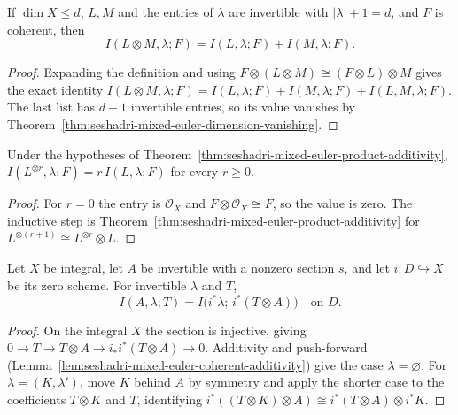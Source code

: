 \begin{theorem}
\label{thm:seshadri-mixed-euler-product-additivity}
\leanok
{}
If $\dim X\le d$, $L,M$ and the entries of $\lambda$ are invertible with $|\lambda|+1=d$,
and $F$ is coherent, then
\[
  I(L\otimes M,\lambda;F)=I(L,\lambda;F)+I(M,\lambda;F).
\]
\end{theorem}
\begin{proof}
Expanding the definition and using $F\otimes(L\otimes M)\cong(F\otimes L)\otimes M$ gives
the exact identity
$I(L\otimes M,\lambda;F)=I(L,\lambda;F)+I(M,\lambda;F)+I(L,M,\lambda;F)$. The last list has
$d+1$ invertible entries, so its value vanishes by
Theorem~\ref{thm:seshadri-mixed-euler-dimension-vanishing}.
\end{proof}

\begin{lemma}
\label{lem:intersection-power-entry}
\leanok
{}
Under the hypotheses of Theorem~\ref{thm:seshadri-mixed-euler-product-additivity},
$I(L^{\otimes r},\lambda;F)=r\,I(L,\lambda;F)$ for every $r\ge0$.
\end{lemma}
\begin{proof}
For $r=0$ the entry is $\mathcal O_X$ and $F\otimes\mathcal O_X\cong F$, so the value is
zero. The inductive step is Theorem~\ref{thm:seshadri-mixed-euler-product-additivity} for
$L^{\otimes(r+1)}\cong L^{\otimes r}\otimes L$.
\end{proof}

\begin{lemma}
\label{lem:seshadri-mixed-euler-section-cut}
\leanok
{}
Let $X$ be integral, let $A$ be invertible with a nonzero section $s$, and let
$i:D\hookrightarrow X$ be its zero scheme. For invertible $\lambda$ and $T$,
\[
  I(A,\lambda;T)=I\bigl(i^*\lambda;\,i^*(T\otimes A)\bigr)\quad\text{on }D.
\]
\end{lemma}
\begin{proof}
On the integral $X$ the section is injective, giving
$0\to T\to T\otimes A\to i_*i^*(T\otimes A)\to0$. Additivity and push-forward
(Lemma~\ref{lem:seshadri-mixed-euler-coherent-additivity}) give the case
$\lambda=\varnothing$. For $\lambda=(K,\lambda')$, move $K$ behind $A$ by symmetry and apply
the shorter case to the coefficients $T\otimes K$ and $T$, identifying
$i^*((T\otimes K)\otimes A)\cong i^*(T\otimes A)\otimes i^*K$.
\end{proof}

